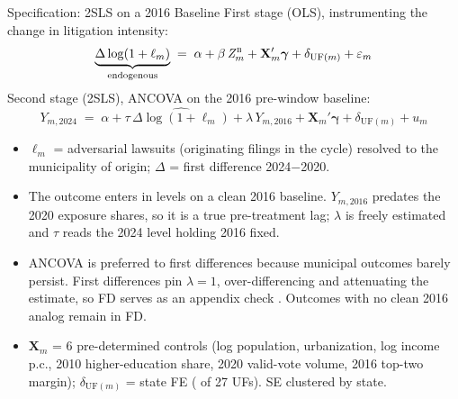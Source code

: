 

\begin{frame}{Specification: 2SLS on a 2016 Baseline}
\hypertarget{src:spec}{}
\small
First stage (OLS), instrumenting the change in litigation intensity:
\[
\underbrace{\Delta\log(1+\ell_{m})}_{\text{endogenous}} \;=\; \alpha + \beta\, \mathit{Z}_{m}^{\textsc{b}} + \mathbf{X}_m'\boldsymbol{\gamma} + \delta_{\text{UF}(m)} + \varepsilon_m
\]
Second stage (2SLS), ANCOVA on the 2016 pre-window baseline:
\[
Y_{m,2024} \;=\; \alpha + \tau\, \widehat{\Delta\log(1+\ell_{m})} + \lambda\, Y_{m,2016} + \mathbf{X}_m'\boldsymbol{\gamma} + \delta_{\text{UF}(m)} + u_m
\]
\begin{itemize}\itemsep1pt
  \item $\ell_m$ = adversarial lawsuits (originating filings in the cycle) resolved to the municipality of origin; $\Delta$ = first difference 2024$-$2020.
  \item The outcome enters in levels on a clean 2016 baseline. $Y_{m,2016}$ predates the 2020 exposure shares, so it is a true pre-treatment lag; $\lambda$ is freely estimated and $\tau$ reads the 2024 level holding 2016 fixed.
  \item \hypertarget{src:fd}{}ANCOVA is preferred to first differences because municipal outcomes barely persist. First differences pin $\lambda=1$, over-differencing and attenuating the estimate, so FD serves as an appendix check . Outcomes with no clean 2016 analog remain in FD.
  \item $\mathbf{X}_m$ = 6 pre-determined controls (log population, urbanization, log income p.c., 2010 higher-education share, 2020 valid-vote volume, 2016 top-two margin); $\delta_{\text{UF}(m)}$ = state FE (\NClusters{} of 27 UFs). SE clustered by state.
\end{itemize}
\end{frame}
